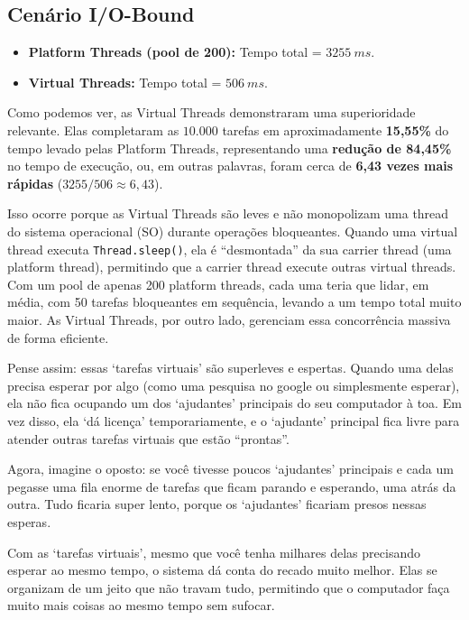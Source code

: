 \documentclass[12pt,a4paper]{article}
\begin{document}
\subsection{Cenário I/O-Bound}
\begin{itemize}
    \item \textbf{Platform Threads (pool de 200):} Tempo total = $3255~ms$.
    \item \textbf{Virtual Threads:} Tempo total = $506~ms$.
\end{itemize}
Como podemos ver, as Virtual Threads demonstraram uma superioridade relevante. Elas completaram as $10.000$ tarefas em aproximadamente \textbf{15,55\%} do tempo levado pelas Platform Threads, representando uma \textbf{redução de 84,45\%} no tempo de execução, ou, em outras palavras, foram cerca de \textbf{6,43 vezes mais rápidas} ($3255 / 506 \approx 6,43$).

Isso ocorre porque as Virtual Threads são leves e não monopolizam uma thread do sistema operacional (SO) durante operações bloqueantes. Quando uma virtual thread executa \texttt{Thread.sleep()}, ela é ``desmontada'' da sua carrier thread (uma platform thread), permitindo que a carrier thread execute outras virtual threads. Com um pool de apenas 200 platform threads, cada uma teria que lidar, em média, com 50 tarefas bloqueantes em sequência, levando a um tempo total muito maior. As Virtual Threads, por outro lado, gerenciam essa concorrência massiva de forma eficiente.

Pense assim: essas `tarefas virtuais' são superleves e espertas. Quando uma delas precisa esperar por algo (como uma pesquisa no google ou simplesmente esperar), ela não fica ocupando um dos `ajudantes' principais do seu computador à toa. Em vez disso, ela `dá licença' temporariamente, e o `ajudante' principal fica livre para atender outras tarefas virtuais que estão ``prontas''.

Agora, imagine o oposto: se você tivesse poucos `ajudantes' principais e cada um pegasse uma fila enorme de tarefas que ficam parando e esperando, uma atrás da outra. Tudo ficaria super lento, porque os `ajudantes' ficariam presos nessas esperas.

Com as `tarefas virtuais', mesmo que você tenha milhares delas precisando esperar ao mesmo tempo, o sistema dá conta do recado muito melhor. Elas se organizam de um jeito que não travam tudo, permitindo que o computador faça muito mais coisas ao mesmo tempo sem sufocar.
\end{document}
